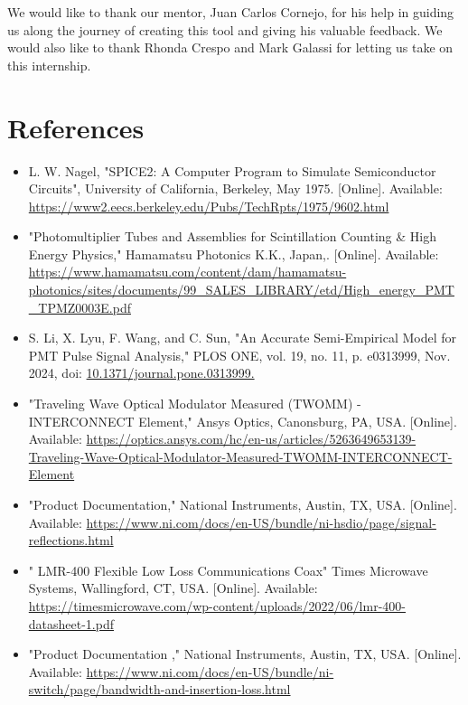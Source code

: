 \documentclass[10pt]{article}
\begin{document}
We would like to thank our mentor, Juan Carlos Cornejo, for his help in guiding us along the journey of creating this tool and giving his valuable feedback. We would also like to thank Rhonda Crespo and Mark Galassi for letting us take on this internship.

\section{References}

\begin{itemize}
\small
\item [1]L. W. Nagel, "SPICE2: A Computer Program to Simulate Semiconductor Circuits", University of California, Berkeley, May 1975. [Online]. Available: \url{https://www2.eecs.berkeley.edu/Pubs/TechRpts/1975/9602.html}


\item [2]"Photomultiplier Tubes and Assemblies for Scintillation Counting & High Energy Physics," Hamamatsu Photonics K.K., Japan,. [Online]. Available: \url{https://www.hamamatsu.com/content/dam/hamamatsu-photonics/sites/documents/99_SALES_LIBRARY/etd/High_energy_PMT_TPMZ0003E.pdf}


\item [3]S. Li, X. Lyu, F. Wang, and C. Sun, "An Accurate Semi-Empirical Model for PMT Pulse Signal Analysis," PLOS ONE, vol. 19, no. 11, p. e0313999, Nov. 2024, doi: \url{10.1371/journal.pone.0313999.}


\item [4]"Traveling Wave Optical Modulator Measured (TWOMM) - INTERCONNECT Element," Ansys Optics, Canonsburg, PA, USA. [Online]. Available: \url{https://optics.ansys.com/hc/en-us/articles/5263649653139-Traveling-Wave-Optical-Modulator-Measured-TWOMM-INTERCONNECT-Element}

\item [5]"Product Documentation," National Instruments, Austin, TX, USA. [Online]. Available: \url{https://www.ni.com/docs/en-US/bundle/ni-hsdio/page/signal-reflections.html}


\item  [6]" LMR-400 Flexible Low Loss Communications Coax" Times Microwave Systems, Wallingford, CT, USA. [Online]. Available: \url{https://timesmicrowave.com/wp-content/uploads/2022/06/lmr-400-datasheet-1.pdf}

\item [7]"Product Documentation ," National Instruments, Austin, TX, USA. [Online]. Available: \url{https://www.ni.com/docs/en-US/bundle/ni-switch/page/bandwidth-and-insertion-loss.html}


\end{itemize}
\end{document}
